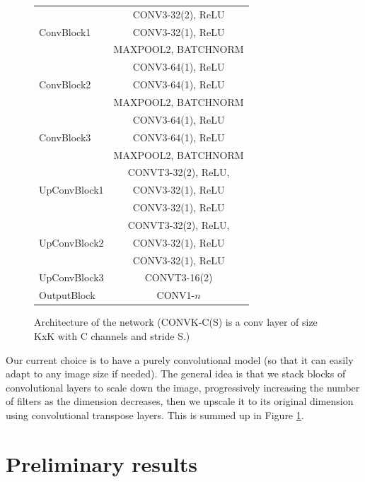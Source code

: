 \documentclass[10pt,twocolumn,letterpaper]{article}
\begin{document}
\begin{figure}
\begin{center}
 \begin{tabular}{|l |c|}
 \hline
 \multirow{3}{60pt}{ConvBlock1}&CONV3-32(2), ReLU\\
    &CONV3-32(1), ReLU\\
    & MAXPOOL2, BATCHNORM \\
 \hline
  \multirow{3}{60pt}{ConvBlock2}&CONV3-64(1), ReLU\\
    &CONV3-64(1), ReLU\\
    & MAXPOOL2, BATCHNORM \\
 \hline
   \multirow{3}{60pt}{ConvBlock3}&CONV3-64(1), ReLU\\
    &CONV3-64(1), ReLU\\
    & MAXPOOL2, BATCHNORM \\
 \hline
    \multirow{3}{60pt}{UpConvBlock1}&CONVT3-32(2), ReLU,\\
    &CONV3-32(1), ReLU\\
    & CONV3-32(1), ReLU \\
 \hline
    \multirow{3}{60pt}{UpConvBlock2}&CONVT3-32(2), ReLU,\\
    &CONV3-32(1), ReLU\\
    & CONV3-32(1), ReLU \\
 \hline
 UpConvBlock3 & CONVT3-16(2)\\
 \hline
 OutputBlock & CONV1-$n$\\
 \hline
\end{tabular}
\end{center}
\caption{Architecture of the network (CONVK-C(S) is a conv layer of size KxK with C channels and stride S.)}
\label{archi}
\end{figure}

Our current choice is to have a purely convolutional model (so that it can easily adapt to any image size if needed).
The general idea is that we stack blocks of convolutional layers to scale down the image, progressively increasing the number of filters as the dimension decreases, then we upscale it to its original dimension using convolutional transpose layers.
This is summed up in Figure \ref{archi}.

\section{Preliminary results}
\end{document}
